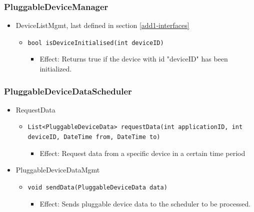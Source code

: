     \subsubsection{PluggableDeviceManager}
        \begin{itemize}
        	\item DeviceListMgmt, last defined in section \ref{add1-interfaces}
        	\begin{itemize}
        		\item \texttt{bool isDeviceInitialised(int deviceID)}
        		\begin{itemize}
        			\item Effect: Returns true if the device with id "deviceID" has been initialized.
        		\end{itemize}
        	\end{itemize}
        \end{itemize}

    \subsubsection{PluggableDeviceDataScheduler}
        \begin{itemize}
            \item RequestData
            \begin{itemize}
                \item \texttt{List<PluggableDeviceData> requestData(int applicationID, int deviceID, DateTime from, DateTime to)}
                \begin{itemize}
                    \item Effect: Request data from a specific device in a certain time period
                \end{itemize}
            \end{itemize}

            \item PluggableDeviceDataMgmt
            \begin{itemize}
                \item \texttt{void sendData(PluggableDeviceData data)}
                \begin{itemize}
                    \item Effect: Sends pluggable device data to the scheduler to be processed.
                \end{itemize}
            \end{itemize}
        \end{itemize}

